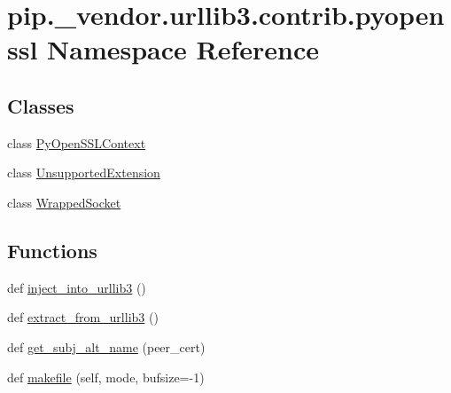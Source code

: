 \hypertarget{namespacepip_1_1__vendor_1_1urllib3_1_1contrib_1_1pyopenssl}{}\section{pip.\+\_\+vendor.\+urllib3.\+contrib.\+pyopenssl Namespace Reference}
\label{namespacepip_1_1__vendor_1_1urllib3_1_1contrib_1_1pyopenssl}
\subsection*{Classes}
\begin{DoxyCompactItemize}
\item 
class \hyperlink{classpip_1_1__vendor_1_1urllib3_1_1contrib_1_1pyopenssl_1_1PyOpenSSLContext}{Py\+Open\+S\+S\+L\+Context}
\item 
class \hyperlink{classpip_1_1__vendor_1_1urllib3_1_1contrib_1_1pyopenssl_1_1UnsupportedExtension}{Unsupported\+Extension}
\item 
class \hyperlink{classpip_1_1__vendor_1_1urllib3_1_1contrib_1_1pyopenssl_1_1WrappedSocket}{Wrapped\+Socket}
\end{DoxyCompactItemize}
\subsection*{Functions}
\begin{DoxyCompactItemize}
\item 
def \hyperlink{namespacepip_1_1__vendor_1_1urllib3_1_1contrib_1_1pyopenssl_a2d09468e8b069804c5b24c0963914bb1}{inject\+\_\+into\+\_\+urllib3} ()
\item 
def \hyperlink{namespacepip_1_1__vendor_1_1urllib3_1_1contrib_1_1pyopenssl_ada6a8c2f43866a79e3a3fe798be2ce91}{extract\+\_\+from\+\_\+urllib3} ()
\item 
def \hyperlink{namespacepip_1_1__vendor_1_1urllib3_1_1contrib_1_1pyopenssl_a52b3ccc3c6845f7cef626166df5c7ead}{get\+\_\+subj\+\_\+alt\+\_\+name} (peer\+\_\+cert)
\item 
def \hyperlink{namespacepip_1_1__vendor_1_1urllib3_1_1contrib_1_1pyopenssl_a779306356dd2d1d73caa0544aa88823f}{makefile} (self, mode, bufsize=-\/1)
\end{DoxyCompactItemize}
